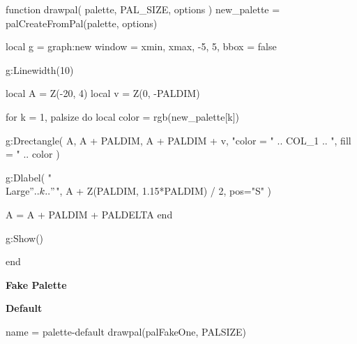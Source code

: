 \documentclass[theme = dark]{tutodoc}
\begin{document}
\pagestyle{empty}
\centering






\begin{luacode*}
function drawpal(
  palette,
  PAL_SIZE,
  options
)
new_palette = palCreateFromPal(palette, options)

local g = graph:new{
  window = {xmin, xmax, -5, 5},
  bbox   = false
}

g:Linewidth(10)

local A = Z(-20, 4)
local v = Z(0, -PALDIM)

for k = 1, palsize do
  local color = rgb(new_palette[k])

  g:Drectangle(
    A, A + PALDIM, A + PALDIM + v,
    "color = " .. COL_1 .. ", fill = " .. color
  )

  g:Dlabel(
    "\\Large$" .. k .. "$",
    A + Z(PALDIM, 1.15*PALDIM) / 2,
    {pos="S"}
  )

  A = A + PALDIM + PALDELTA
end

g:Show()

end
\end{luacode*}



\centering

{\Huge\bfseries Fake Palette}



\bigskip
\bigskip

{\Large\bfseries Default}

\smallskip

\begin{luadraw}{name = palette-default}
drawpal(palFakeOne, PALSIZE)
\end{luadraw}
\end{document}
